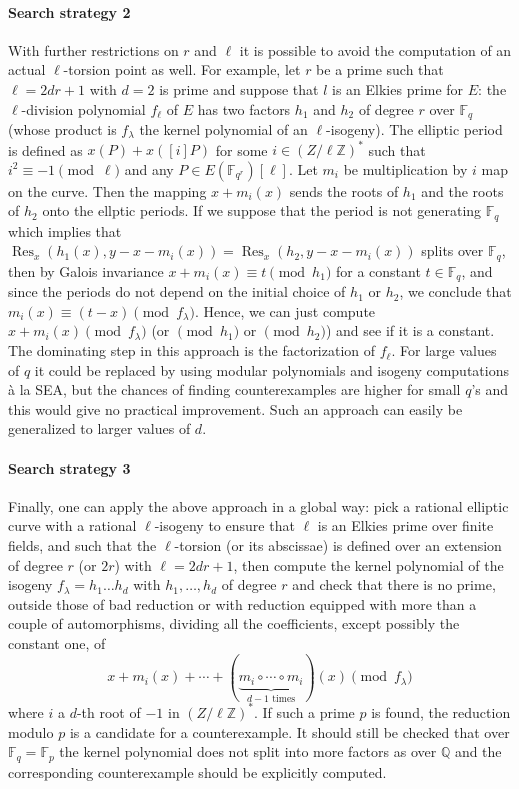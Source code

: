 \documentclass[12pt]{article}
\theoremstyle{plain}
\theoremstyle{definition}
\DeclareMathOperator{\Res}{Res}
\def\Q{\ensuremath{\mathbb{Q}}}
\def\Z{\ensuremath{\mathbb{Z}}}
\def\F{\ensuremath{\mathbb{F}}}
\begin{document}
\paragraph{Search strategy 2}
With further restrictions on $r$ and $\ell$ it is possible to avoid
the computation of an actual $\ell$-torsion point as well.
For example, let $r$ be a prime such that $\ell = 2 d r + 1$
with $d = 2$ is prime
and suppose that $l$ is an Elkies prime for $E$:
the $\ell$-division polynomial $f_\ell$ of $E$ has two factors
$h_1$ and $h_2$ of degree $r$ over $\F_{q}$
(whose product is $f_\lambda$ the kernel polynomial of an $\ell$-isogeny).
The elliptic period is defined as $x(P) + x([i] P)$ for some
$i \in \left(Z / \ell \Z\right)^*$ such that $i^2 \equiv -1 \pmod{\ell}$
and any $P \in E(\F_{q^r})[\ell]$.
Let $m_i$ be multiplication by $i$ map on the curve.
Then the mapping $x + m_i(x)$ sends the roots of $h_1$
and the roots of $h_2$ onto the ellptic periods.
If we suppose that the period is not generating $\F_{q}$ which implies that
$\Res_x(h_1(x),y-x-m_i(x)) = \Res_x(h_2,y-x-m_i(x))$
splits over $\F_{q}$,
then by Galois invariance $x + m_i(x) \equiv t \pmod{h_1}$
for a constant $t \in \F_{q}$,
and since the periods do not depend on the initial choice of $h_1$
or $h_2$,
we conclude that $m_i(x) \equiv (t-x) \pmod{f_\lambda}$.
Hence, we can just compute $x + m_i(x) \pmod{f_\lambda}$ (or $\pmod{h_1}$
or $\pmod{h_2}$) and see if it is a constant.
The dominating step in this approach is the factorization of $f_\ell$.
For large values of $q$ it could be replaced by using modular polynomials
and isogeny computations \`a la SEA, but the chances of finding counterexamples
are higher for small $q$'s and this would give no practical improvement.
Such an approach can easily be generalized to larger values of $d$.

\paragraph{Search strategy 3}
Finally, one can apply the above approach in a global way:
pick a rational elliptic curve with a rational $\ell$-isogeny
to ensure that $\ell$ is an Elkies prime over finite fields,
and such that the $\ell$-torsion (or its abscissae) is defined
over an extension of degree $r$ (or $2r$) with $\ell = 2 d r + 1$,
then compute the kernel polynomial of the isogeny
$f_\lambda = h_1 \ldots h_d$ with $h_1, \ldots, h_d$ of degree $r$
and check that there is no prime, outside those of bad reduction or
with reduction equipped with more than a couple of automorphisms,
dividing all the coefficients, except possibly the constant one, of
\[
x + m_i(x) + \cdots + (\underbrace{m_i \circ \cdots \circ m_i}_\text{$d-1$ times}) (x) \pmod{f_\lambda}
\]
where $i$ a $d$-th root of $-1$ in $\left(Z / \ell \Z\right)^*$.
If such a prime $p$ is found, the reduction modulo $p$ is a
candidate for a counterexample.
It should still be checked that over $\F_q = \F_p$ the kernel polynomial
does not split into more factors as over $\Q$
and the corresponding counterexample should be explicitly computed.
\end{document}
